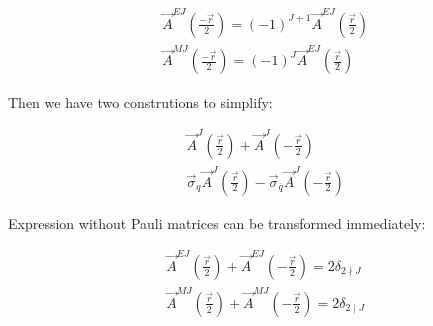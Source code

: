 \begin{align}
    &\vec{A}^{EJ}(\frac{-\vec{r}}{2}) = (-1)^{J+1} \vec{A}^{EJ}(\frac{\vec{r}}{2}) \\
    &\vec{A}^{MJ}(\frac{-\vec{r}}{2}) = (-1)^{J} \vec{A}^{EJ}(\frac{\vec{r}}{2})
\end{align}

Then we have two construtions to simplify:

\begin{align}
    &\vec{A}^{J}(\frac{\vec{r}}{2}) + \vec{A}^{J}(-\frac{\vec{r}}{2}) \\
    &\vec{\sigma}_{q} \vec{A}^{J}(\frac{\vec{r}}{2}) - \vec{\sigma}_{\overline{q}} \vec{A}^{J}(-\frac{\vec{r}}{2}) \label{eq:sigmaAJ}
\end{align}

Expression without Pauli matrices can be transformed immediately:

\begin{align}
    &\vec{A}^{EJ}(\frac{\vec{r}}{2}) + \vec{A}^{EJ}(-\frac{\vec{r}}{2}) = 2 \delta_{2 \nmid J} \\
    &\vec{A}^{MJ}(\frac{\vec{r}}{2}) + \vec{A}^{MJ}(-\frac{\vec{r}}{2}) = 2 \delta_{2 \mid J}
\end{align}


